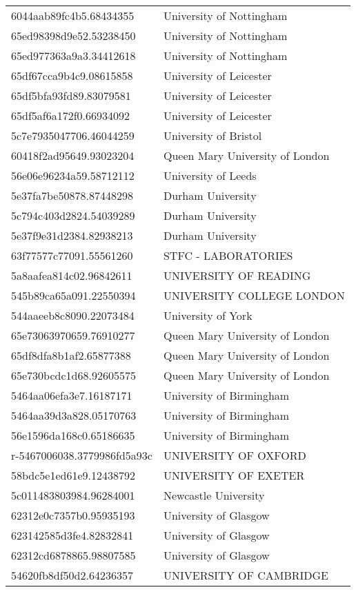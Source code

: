 \begin{tabular}{ll}
6044aab89fc4b5.68434355 & University of Nottingham \\
65ed98398d9e52.53238450 & University of Nottingham \\
65ed977363a9a3.34412618 & University of Nottingham \\
65df67cca9b4c9.08615858 & University of Leicester \\
65df5bfa93fd89.83079581 & University of Leicester \\
65df5af6a172f0.66934092 & University of Leicester \\
5c7e7935047706.46044259 & University of Bristol \\
60418f2ad95649.93023204 & Queen Mary University of London \\
56e06e96234a59.58712112 & University of Leeds \\
5e37fa7be50878.87448298 & Durham University \\
5c794c403d2824.54039289 & Durham University \\
5e37f9e31d2384.82938213 & Durham University \\
63f77577c77091.55561260 & STFC - LABORATORIES \\
5a8aafea814c02.96842611 & UNIVERSITY OF READING \\
545b89ca65a091.22550394 & UNIVERSITY COLLEGE LONDON \\
544aaeeb8c8090.22073484 & University of York \\
65e73063970659.76910277 & Queen Mary University of London \\
65df8dfa8b1af2.65877388 & Queen Mary University of London \\
65e730bcdc1d68.92605575 & Queen Mary University of London \\
5464aa06efa3e7.16187171 & University of Birmingham \\
5464aa39d3a828.05170763 & University of Birmingham \\
56e1596da168c0.65186635 & University of Birmingham \\
r-5467006038.3779986fd5a93c & UNIVERSITY OF OXFORD \\
58bdc5e1ed61e9.12438792 & UNIVERSITY OF EXETER \\
5c011483803984.96284001 & Newcastle University \\
62312e0c7357b0.95935193 & University of Glasgow \\
623142585d3fe4.82832841 & University of Glasgow \\
62312cd6878865.98807585 & University of Glasgow \\
54620fb8df50d2.64236357 & UNIVERSITY OF CAMBRIDGE \\

\end{tabular}

